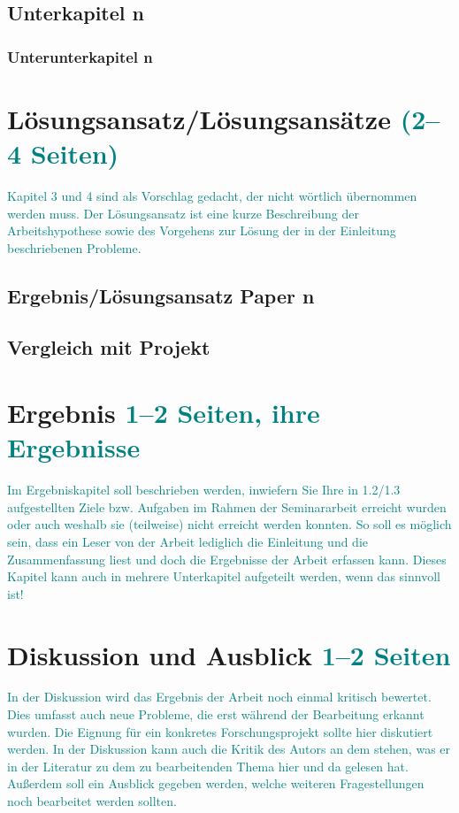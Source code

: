\documentclass[headsepline,titlepage,twoside,12pt]{report}
\newcommand\todo[1]{\textcolor{teal}{#1}}%
\begin{document}
\section{Unterkapitel n}
\subsection{Unterunterkapitel n}

\chapter{Lösungsansatz/Lösungsansätze \todo{(2--4 Seiten)}}
\todo{Kapitel 3 und 4 sind als Vorschlag gedacht, der nicht wörtlich übernommen werden muss.
Der Lösungsansatz ist eine kurze Beschreibung der Arbeitshypothese sowie des Vorgehens zur Lösung der in der Einleitung beschriebenen Probleme.}

\section{Ergebnis/Lösungsansatz Paper n}
\section{Vergleich mit Projekt}


\chapter{Ergebnis \todo{1--2 Seiten, ihre Ergebnisse}}
\todo{
Im Ergebniskapitel soll beschrieben werden, inwiefern Sie Ihre in 1.2/1.3 aufgestellten Ziele bzw. Aufgaben im Rahmen der Seminararbeit erreicht wurden oder auch weshalb sie (teilweise) nicht erreicht werden konnten. So soll es möglich sein, dass ein Leser von der Arbeit lediglich die Einleitung und die Zusammenfassung liest und doch die Ergebnisse der Arbeit erfassen kann.
Dieses Kapitel kann auch in mehrere Unterkapitel aufgeteilt werden, wenn das sinnvoll ist!
}

\chapter{Diskussion und Ausblick \todo{1--2 Seiten}}
\todo{
In der Diskussion wird das Ergebnis der Arbeit noch einmal kritisch bewertet. Dies umfasst auch neue Probleme, die erst während der Bearbeitung erkannt wurden. Die Eignung für ein konkretes Forschungsprojekt sollte hier diskutiert werden. In der Diskussion kann auch die Kritik des Autors an dem stehen, was er in der Literatur zu dem zu bearbeitenden Thema hier und da gelesen hat. Außerdem soll ein Ausblick gegeben werden, welche weiteren Fragestellungen noch bearbeitet werden sollten.
}
\end{document}
